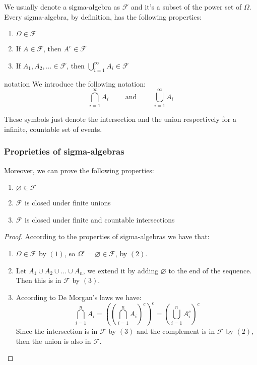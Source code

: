 \documentclass[10pt]{extarticle}
\newcommand{\F}{\mathcal{F}}
\begin{document}
We usually denote a sigma-algebra as $\F$ and it's a subset of the power set of $\Omega$.
Every sigma-algebra, by definition, has the following properties:
\begin{enumerate}
    \item $\Omega \in \F$
    \item If $A \in \F$, then $A^c \in \F$
    \item If $A_1, A_2, \dots \in \F$, then $\bigcup_{i=1}^\infty A_i \in \F$
\end{enumerate}

\begin{notebox}{notation}
    We introduce the following notation:
    $$
        \bigcap_{i=1}^\infty A_i \qquad \text{ and } \qquad \bigcup_{i=1}^\infty A_i
    $$

    These symbols just denote the intersection and the union respectively for a infinite, countable set of events.
\end{notebox}

\subsubsection{Proprieties of sigma-algebras}

Moreover, we can prove the following properties:
\begin{enumerate}
    \item $\varnothing \in \F$
    \item $\F$ is closed under finite unions
    \item $\F$ is closed under finite and countable intersections
\end{enumerate}

\begin{proof}
    According to the properties of sigma-algebras we have that:

    \begin{enumerate}
        \item $\Omega \in \F$ by $(1)$, so $\Omega^c = \varnothing \in \F$, by $(2)$.
        \item Let $A_1 \cup A_2 \cup \dots \cup A_n$, we extend it by adding $\varnothing$ to the end of the sequence.
              Then this is in $\F$ by $(3)$.
        \item According to De Morgan's laws we have:
              $$
                  \bigcap_{i=1}^n A_i = \left(\left(\bigcap_{i=1}^n A_i\right)^c\right)^c = \left(\bigcup_{i=1}^n A_i^c\right)^c
              $$
              Since the intersection is in $\F$ by $(3)$ and the complement is in $\F$ by $(2)$, then the union is also in $\F$.
    \end{enumerate}
\end{proof}
\end{document}
